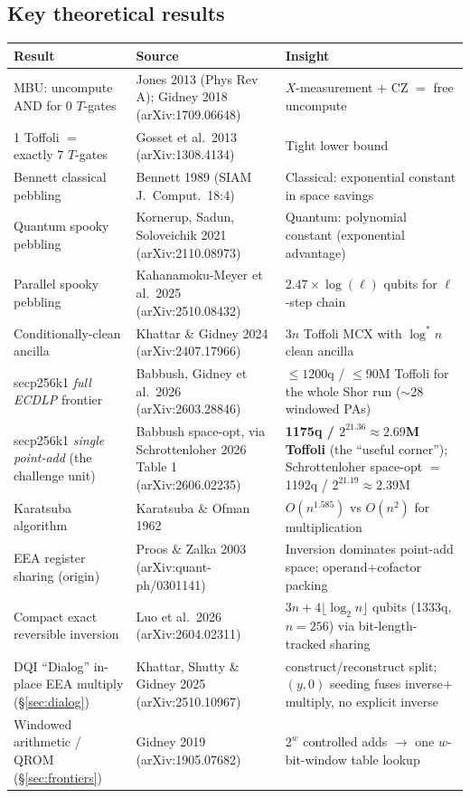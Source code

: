 \documentclass[11pt,a4paper]{article}
\begin{document}
\subsection{Key theoretical results}

\begin{center}
\small
\begin{tabular}{p{4.5cm}p{4.5cm}p{4.5cm}}
\toprule
\textbf{Result} & \textbf{Source} & \textbf{Insight} \\
\midrule
MBU: uncompute AND for 0 $T$-gates & Jones 2013 (Phys Rev A); Gidney 2018 (arXiv:1709.06648) & $X$-measurement $+$ CZ $=$ free uncompute \\
1 Toffoli $=$ exactly 7 $T$-gates & Gosset et al.\ 2013 (arXiv:1308.4134) & Tight lower bound \\
Bennett classical pebbling & Bennett 1989 (SIAM J.\ Comput.\ 18:4) & Classical: exponential constant in space savings \\
Quantum spooky pebbling & Kornerup, Sadun, Soloveichik 2021 (arXiv:2110.08973) & Quantum: polynomial constant (exponential advantage) \\
Parallel spooky pebbling & Kahanamoku-Meyer et al.\ 2025 (arXiv:2510.08432) & $2.47 \times \log(\ell)$ qubits for $\ell$-step chain \\
Conditionally-clean ancilla & Khattar \& Gidney 2024 (arXiv:2407.17966) & $3n$ Toffoli MCX with $\log^* n$ clean ancilla \\
secp256k1 \emph{full ECDLP} frontier & Babbush, Gidney et al.\ 2026 (arXiv:2603.28846) & $\leq1200$q / $\leq90$M Toffoli for the whole Shor run ($\sim$28 windowed PAs) \\
secp256k1 \emph{single point-add} (the challenge unit) & Babbush space-opt, via Schrottenloher 2026 Table 1 (arXiv:2606.02235) & \textbf{1175q / $2^{21.36}\approx2.69$M Toffoli} (the ``useful corner''); Schrottenloher space-opt $=$ 1192q / $2^{21.19}\approx2.39$M \\
Karatsuba algorithm & Karatsuba \& Ofman 1962 & $O(n^{1.585})$ vs $O(n^2)$ for multiplication \\
EEA register sharing (origin) & Proos \& Zalka 2003 (arXiv:quant-ph/0301141) & Inversion dominates point-add space; operand$+$cofactor packing \\
Compact exact reversible inversion & Luo et al.\ 2026 (arXiv:2604.02311) & $3n + 4\lfloor\log_2 n\rfloor$ qubits (1333q, $n{=}256$) via bit-length-tracked sharing \\
DQI ``Dialog'' in-place EEA multiply (\S\ref{sec:dialog}) & Khattar, Shutty \& Gidney 2025 (arXiv:2510.10967) & construct/reconstruct split; $(y,0)$ seeding fuses inverse$+$multiply, no explicit inverse \\
Windowed arithmetic / QROM (\S\ref{sec:frontiers}) & Gidney 2019 (arXiv:1905.07682) & $2^w$ controlled adds $\to$ one $w$-bit-window table lookup \\
\bottomrule
\end{tabular}
\end{center}
\end{document}
